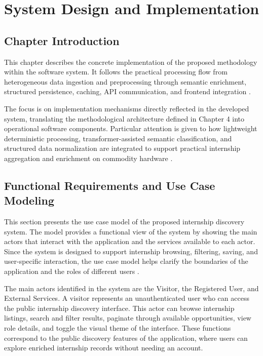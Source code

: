 \chapter{System Design and Implementation}

\section{Chapter Introduction}

This chapter describes the concrete implementation of the proposed methodology within the software system. It follows the practical processing flow from heterogeneous data ingestion and preprocessing through semantic enrichment, structured persistence, caching, API communication, and frontend integration \cite{bass2012software, sommerville2016software}.

The focus is on implementation mechanisms directly reflected in the developed system, translating the methodological architecture defined in Chapter 4 into operational software components. Particular attention is given to how lightweight deterministic processing, transformer-assisted semantic classification, and structured data normalization are integrated to support practical internship aggregation and enrichment on commodity hardware \cite{peffers2007design, bass2012software}.

\section{Functional Requirements and Use Case Modeling}

This section presents the use case model of the proposed internship discovery system. The model provides a functional view of the system by showing the main actors that interact with the application and the services available to each actor. Since the system is designed to support internship browsing, filtering, saving, and user-specific interaction, the use case model helps clarify the boundaries of the application and the roles of different users \cite{jacobson1992object, sommerville2016software}.

The main actors identified in the system are the Visitor, the Registered User, and External Services. A visitor represents an unauthenticated user who can access the public internship discovery interface. This actor can browse internship listings, search and filter results, paginate through available opportunities, view role details, and toggle the visual theme of the interface. These functions correspond to the public discovery features of the application, where users can explore enriched internship records without needing an account.

